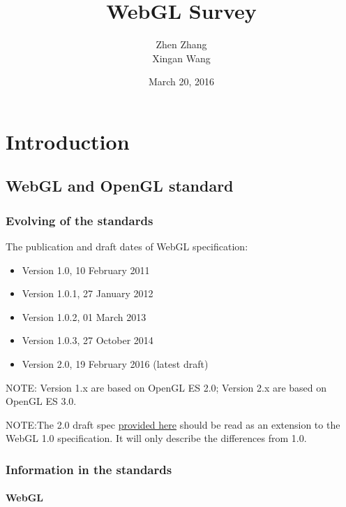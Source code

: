 \documentclass[]{article}
\title{WebGL Survey}
\author{Zhen Zhang \\ Xingan Wang}
\date{March 20, 2016}
\begin{document}
\maketitle

\tableofcontents
\setcounter{tocdepth}{3}

\newpage
\section{Introduction}\label{introduction}

\subsection{WebGL and OpenGL standard}\label{webgl-and-opengl-standard}

\subsubsection{Evolving of the
standards}\label{evolving-of-the-standards}

The publication and draft dates of WebGL specification:

\begin{itemize}
\itemsep1pt\parskip0pt
\item
  Version 1.0, 10 February 2011
\item
  Version 1.0.1, 27 January 2012
\item
  Version 1.0.2, 01 March 2013
\item
  Version 1.0.3, 27 October 2014
\item
  Version 2.0, 19 February 2016 (latest draft)
\end{itemize}

NOTE: Version 1.x are based on OpenGL ES 2.0; Version 2.x are based on
OpenGL ES 3.0.

NOTE:The 2.0 draft spec
\href{https://www.khronos.org/registry/webgl/specs/latest/2.0}{provided
here} should be read as an extension to the WebGL 1.0 specification. It
will only describe the differences from 1.0.

\subsubsection{Information in the
standards}\label{information-in-the-standards}

\paragraph{WebGL}\label{webgl}
\end{document}
